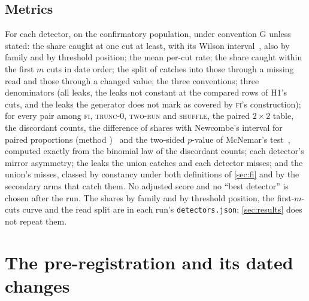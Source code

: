 \documentclass[11pt]{article}
\newcommand{\code}[1]{\texttt{#1}}
\newcommand{\FI}{\textsc{fi}}
\newcommand{\TZ}{\textsc{trunc-0}}
\newcommand{\TR}{\textsc{two-run}}
\newcommand{\SH}{\textsc{shuffle}}
\begin{document}
\subsection{Metrics}\label{sec:metrics}
For each detector, on the confirmatory population, under convention G unless stated:
the share caught at one cut at least, with its Wilson interval~\cite{wilson1927}, %
 also by family and by threshold
position; the mean per-cut rate; the share caught within the first $m$ cuts in date order; the split
of catches into those through a missing read and those through a changed value; the three
conventions; three denominators (all \NumPopN{} leaks, the leaks not constant at the compared rows
of H1's cuts, and the leaks the generator does not mark as covered by \FI's construction); for every
pair among \FI, \TZ, \TR{} and \SH, the paired $2\times 2$ table, the discordant counts, the
difference of shares with Newcombe's interval for paired proportions (method
\NumNewcombeMethod)~\cite{newcombe1998paired} %
and the two-sided $p$-value of McNemar's test~\cite{mcnemar1947}, computed exactly from the binomial law of the discordant counts; %
 each detector's mirror asymmetry; the
leaks the union catches and each detector misses; and the union's misses, classed by constancy under
both definitions of \cref{sec:fi} and by the secondary arms that catch them. No adjusted score and no
``best detector'' is chosen after the run. The shares by family and by threshold position, the
first-$m$-cuts curve and the read split are in each run's \code{detectors.json}; \cref{sec:results}
does not repeat them.

\section{The pre-registration and its dated changes}\label{sec:prereg}
\end{document}
